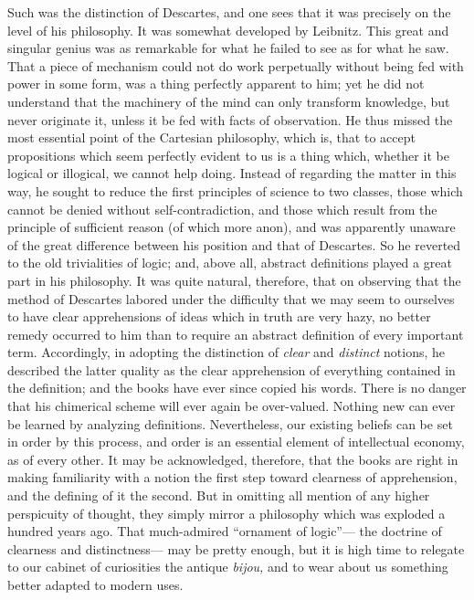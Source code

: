 Such was the distinction of Descartes, and one sees that it was precisely on the level of his philosophy. It was somewhat developed by Leibnitz. This great and singular genius was as remarkable for what he failed to see as for what he saw. That a piece of mechanism could not do work perpetually without being fed with power in some form, was a thing perfectly apparent to him; yet he did not understand that the machinery of the mind can only transform knowledge, but never originate it, unless it be fed with facts of observation. He thus missed the most essential point of the Cartesian philosophy, which is, that to accept propositions which seem perfectly evident to us is a thing which, whether it be logical or illogical, we cannot help doing. Instead of regarding the matter in this way, he sought to reduce the first principles of science to two classes, those which cannot be denied without self-contradiction, and those which result from the principle of sufficient reason (of which more anon), and was apparently unaware of the great difference between his position and that of Descartes. So he reverted to the old trivialities of logic; and, above all, abstract definitions played a great part in his philosophy. It was quite natural, therefore, that on observing that the method of Descartes labored under the difficulty that we may seem to ourselves to have clear apprehensions of ideas which in truth are very hazy, no better remedy occurred to him than to require an abstract definition of every important term. Accordingly, in adopting the distinction of \emph{clear} and \emph{distinct} notions, he described the latter quality as the clear apprehension of everything contained in the definition; and the books have ever since copied his words. There is no danger that his chimerical scheme will ever again be over-valued. Nothing new can ever be learned by analyzing definitions. Nevertheless, our existing  beliefs can be set in order by this process, and order is an essential element of intellectual economy, as of every other. It may be acknowledged, therefore, that the books are right in making familiarity with a notion the first step toward clearness of apprehension, and the defining of it the second. But in omitting all mention of any higher perspicuity of thought, they simply mirror a philosophy which was exploded a hundred years ago. That much-admired ``ornament of logic''--- the doctrine of clearness and distinctness--- may be pretty enough, but it is high time to relegate to our cabinet of curiosities the antique \emph{bijou,} and to wear about us something better adapted to modern uses.

